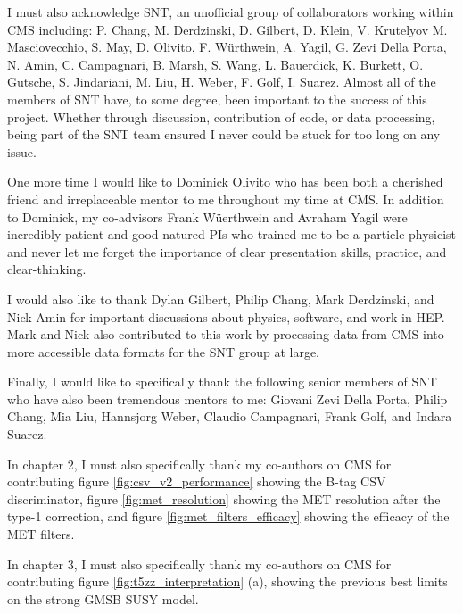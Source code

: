 \begin{frontmatter}
\begin{acknowledgements}
I must also acknowledge SNT, an unofficial group of collaborators working within CMS including: P. Chang, M. Derdzinski, D. Gilbert, D. Klein, V. Krutelyov M. Masciovecchio, S. May, D. Olivito, F. Würthwein, A. Yagil, G. Zevi Della Porta, N. Amin, C. Campagnari, B. Marsh, S. Wang, L. Bauerdick, K. Burkett, O. Gutsche, S. Jindariani, M. Liu, H. Weber, F. Golf, I. Suarez. Almost all of the members of SNT have, to some degree, been important to the success of this project. Whether through discussion, contribution of code, or data processing, being part of the SNT team ensured I never could be stuck for too long on any issue.

One more time I would like to Dominick Olivito who has been both a cherished friend and irreplaceable mentor to me throughout my time at CMS. In addition to Dominick, my co-advisors Frank W\"uerthwein and Avraham Yagil were incredibly patient and good-natured PIs who trained me to be a particle physicist and never let me forget the importance of clear presentation skills, practice, and clear-thinking.

I would also like to thank Dylan Gilbert, Philip Chang, Mark Derdzinski, and Nick Amin for important discussions about physics, software, and work in HEP. Mark and Nick also contributed to this work by processing data from CMS into more accessible data formats for the SNT group at large. 

Finally, I would like to specifically thank the following senior members of SNT who have also been tremendous mentors to me: Giovani Zevi Della Porta, Philip Chang, Mia Liu, Hannsjorg Weber, Claudio Campagnari, Frank Golf, and Indara Suarez.

In chapter 2, I must also specifically thank my co-authors on CMS for contributing figure \ref{fig:csv_v2_performance} showing the B-tag CSV discriminator, figure \ref{fig:met_resolution} showing the MET resolution after the type-1 correction, and figure \ref{fig:met_filters_efficacy} showing the efficacy of the MET filters.

In chapter 3, I must also specifically thank my co-authors on CMS for contributing figure \ref{fig:t5zz_interpretation} (a), showing the previous best limits on the strong GMSB SUSY model.
\end{acknowledgements}



\end{frontmatter}
